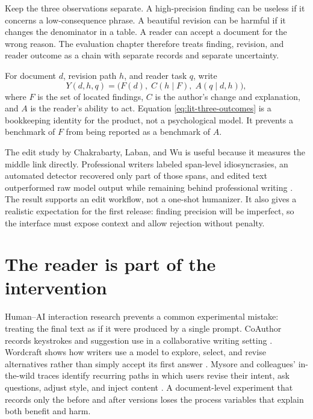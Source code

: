 Keep the three observations separate. A high-precision finding can be useless
if it concerns a low-consequence phrase. A beautiful revision can be harmful if
it changes the denominator in a table. A reader can accept a document for the
wrong reason. The evaluation chapter therefore treats finding, revision, and
reader outcome as a chain with separate records and separate uncertainty.

For document $d$, revision path $h$, and reader task $q$, write
\begin{equation}
  Y(d,h,q) = \bigl(F(d),\; C(h\mid F),\; A(q\mid d,h)\bigr),
  \label{eq:lit-three-outcomes}
\end{equation}
where $F$ is the set of located findings, $C$ is the author's change and
explanation, and $A$ is the reader's ability to act. Equation
\eqref{eq:lit-three-outcomes} is a bookkeeping identity for the product, not a
psychological model. It prevents a benchmark of $F$ from being reported as a
benchmark of $A$.

The edit study by Chakrabarty, Laban, and Wu is useful because it measures the
middle link directly. Professional writers labeled span-level idiosyncrasies,
an automated detector recovered only part of those spans, and edited text
outperformed raw model output while remaining behind professional writing
\citep{chakrabarty2024salvage}. The result supports an edit workflow, not a
one-shot humanizer. It also gives a realistic expectation for the first
release: finding precision will be imperfect, so the interface must expose
context and allow rejection without penalty.

\section{The reader is part of the intervention}
\label{sec:lit-reader-interaction}

Human--AI interaction research prevents a common experimental mistake: treating
the final text as if it were produced by a single prompt. CoAuthor records
keystrokes and suggestion use in a collaborative writing setting
\citep{lee2022coauthor}. Wordcraft shows how writers use a model to explore,
select, and revise alternatives rather than simply accept its first answer
\citep{yuan2022wordcraft}. Mysore and colleagues' in-the-wild traces identify
recurring paths in which users revise their intent, ask questions, adjust
style, and inject content \citep{mysore2025paths}. A document-level experiment
that records only the before and after versions loses the process variables
that explain both benefit and harm.

